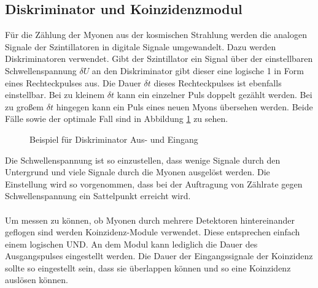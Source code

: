 \subsection{Diskriminator und Koinzidenzmodul}
Für die Zählung der Myonen aus der kosmischen Strahlung werden die analogen Signale der Szintillatoren in digitale Signale umgewandelt. Dazu werden Diskriminatoren verwendet. Gibt der Szintillator ein Signal über der einstellbaren Schwellenspannung $\delta U$ an den Diskriminator gibt dieser eine logische 1 in Form eines Rechteckpulses aus. Die Dauer $\delta t$ dieses Rechteckpulses ist ebenfalls einstellbar. Bei zu kleinem $\delta t$ kann ein einzelner Puls doppelt gezählt werden. Bei zu großem $\delta t$ hingegen kann ein Puls eines neuen Myons übersehen werden. Beide Fälle sowie der optimale Fall sind in Abbildung \ref{fig:diskriminator} zu sehen.

\begin{figure}[h]
  \centering
  \caption{Beispiel für Diskriminator Aus- und Eingang}
  \label{fig:diskriminator}
\end{figure}

Die Schwellenspannung ist so einzustellen, dass wenige Signale durch den Untergrund und viele Signale durch die Myonen ausgelöst werden. Die Einstellung wird so vorgenommen, dass bei der Auftragung von Zählrate gegen Schwellenspannung ein Sattelpunkt erreicht wird. \\ \\
Um messen zu können, ob Myonen durch mehrere Detektoren hintereinander geflogen sind werden Koinzidenz-Module verwendet. Diese entsprechen einfach einem logischen UND. An dem Modul kann lediglich die Dauer des Ausgangspulses eingestellt werden. Die Dauer der Eingangssignale der Koinzidenz sollte so eingestellt sein, dass sie überlappen können und so eine Koinzidenz auslösen können.

